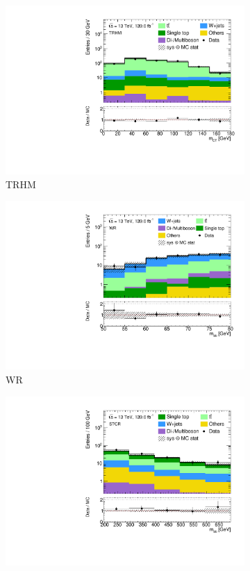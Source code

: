 \begin{figure}
\begin{subfigure}[b]{0.5\linewidth}
		\centering\includegraphics[width=1.0\textwidth]{1Lbb_TRHM_mct}
		\caption{TRHM\label{fig:signal_contamination_TRHM}}
	\end{subfigure}\hfill
	\begin{subfigure}[b]{0.5\linewidth}
		\centering\includegraphics[width=1.0\textwidth]{1Lbb_WR_mbb}
		\caption{WR\label{fig:signal_contamination_WR}}
	\end{subfigure}\hfill
	\begin{subfigure}[b]{0.5\linewidth}
		\centering\includegraphics[width=1.0\textwidth]{1Lbb_STCR_mbb}

\end{subfigure}
\end{figure}
